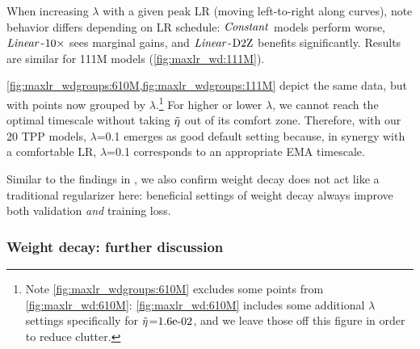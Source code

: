 

When increasing $\lambda$ with a given peak LR (moving left-to-right
along curves), note behavior differs depending on LR schedule:
$\mbox{\emph{Constant}}$ models perform worse, $\mbox{\emph{Linear}}$-$\mbox{10}\times$ sees marginal
gains, and $\mbox{\emph{Linear}}$-$\mbox{D2Z}$ benefits significantly.  Results are
similar for 111M models (\cref{fig:maxlr_wd:111M}).




\cref{fig:maxlr_wdgroups:610M,fig:maxlr_wdgroups:111M} depict the same
data, but with points now grouped by $\lambda$.\footnote{Note
\cref{fig:maxlr_wdgroups:610M} excludes some points from
\cref{fig:maxlr_wd:610M}: \cref{fig:maxlr_wd:610M} includes some
additional $\lambda$ settings specifically for $\tilde{\eta}$=$1.6\mbox{e-}02$, and
we leave those off this figure in order to reduce clutter.} For higher
or lower $\lambda$, we cannot reach the optimal timescale without
taking $\tilde{\eta}$ out of its comfort zone.  Therefore, with our 20 TPP
models, $\lambda$=0.1 emerges as good default setting because, in
synergy with a comfortable LR, $\lambda$=0.1 corresponds to an
appropriate EMA timescale.

Similar to the findings in \citet{andriushchenko2023why}, we also
confirm weight decay does not act like a traditional regularizer here:
beneficial settings of weight decay always improve both validation
\emph{and} training loss.

%




\subsubsection{Weight decay: further discussion}

